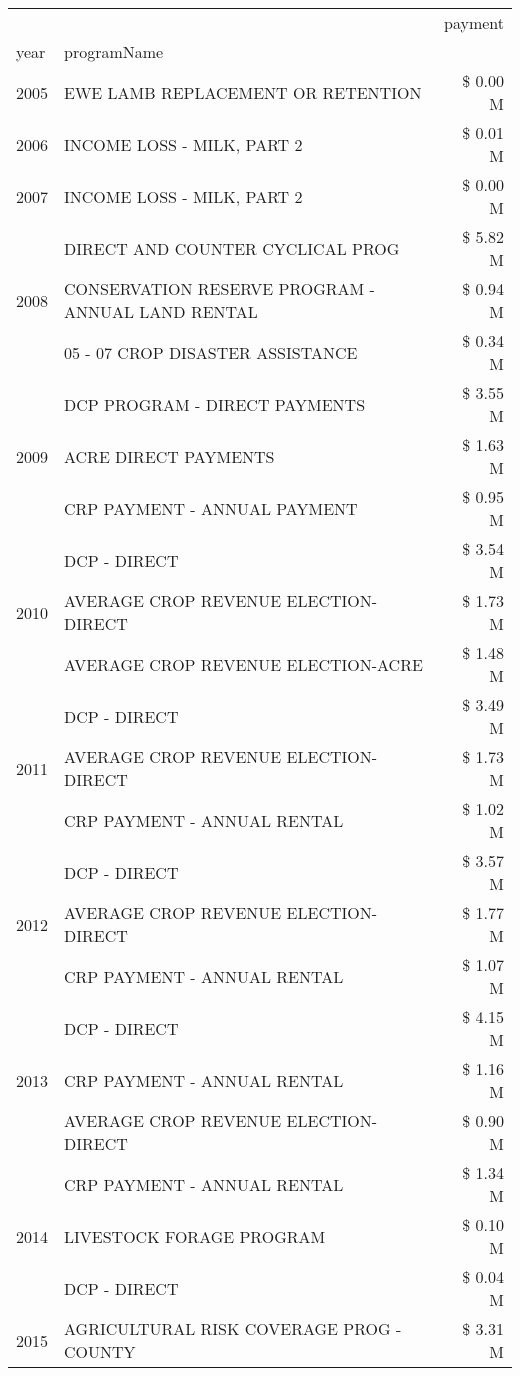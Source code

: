 \begin{tabular}{llr}
\toprule
 &  & payment \\
year & programName &  \\
\midrule
2005 & EWE LAMB REPLACEMENT OR RETENTION & \$ 0.00 M \\
\cline{1-3}
2006 & INCOME LOSS - MILK, PART 2 & \$ 0.01 M \\
\cline{1-3}
2007 & INCOME LOSS - MILK, PART 2 & \$ 0.00 M \\
\cline{1-3}
\multirow[t]{3}{*}{2008} & DIRECT AND COUNTER CYCLICAL PROG & \$ 5.82 M \\
 & CONSERVATION RESERVE PROGRAM - ANNUAL LAND RENTAL & \$ 0.94 M \\
 & 05 - 07 CROP DISASTER ASSISTANCE & \$ 0.34 M \\
\cline{1-3}
\multirow[t]{3}{*}{2009} & DCP PROGRAM - DIRECT PAYMENTS & \$ 3.55 M \\
 & ACRE DIRECT PAYMENTS & \$ 1.63 M \\
 & CRP PAYMENT - ANNUAL PAYMENT & \$ 0.95 M \\
\cline{1-3}
\multirow[t]{3}{*}{2010} & DCP - DIRECT & \$ 3.54 M \\
 & AVERAGE CROP REVENUE ELECTION-DIRECT & \$ 1.73 M \\
 & AVERAGE CROP REVENUE ELECTION-ACRE & \$ 1.48 M \\
\cline{1-3}
\multirow[t]{3}{*}{2011} & DCP - DIRECT & \$ 3.49 M \\
 & AVERAGE CROP REVENUE ELECTION-DIRECT & \$ 1.73 M \\
 & CRP PAYMENT - ANNUAL RENTAL & \$ 1.02 M \\
\cline{1-3}
\multirow[t]{3}{*}{2012} & DCP - DIRECT & \$ 3.57 M \\
 & AVERAGE CROP REVENUE ELECTION-DIRECT & \$ 1.77 M \\
 & CRP PAYMENT - ANNUAL RENTAL & \$ 1.07 M \\
\cline{1-3}
\multirow[t]{3}{*}{2013} & DCP - DIRECT & \$ 4.15 M \\
 & CRP PAYMENT - ANNUAL RENTAL & \$ 1.16 M \\
 & AVERAGE CROP REVENUE ELECTION-DIRECT & \$ 0.90 M \\
\cline{1-3}
\multirow[t]{3}{*}{2014} & CRP PAYMENT - ANNUAL RENTAL & \$ 1.34 M \\
 & LIVESTOCK FORAGE PROGRAM & \$ 0.10 M \\
 & DCP - DIRECT & \$ 0.04 M \\
\cline{1-3}
\multirow[t]{3}{*}{2015} & AGRICULTURAL RISK COVERAGE PROG - COUNTY & \$ 3.31 M \\

\end{tabular}
